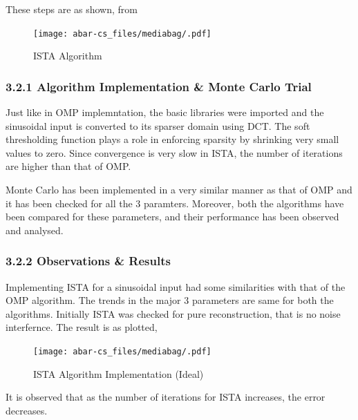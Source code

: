 \documentclass[
  letterpaper,
  DIV=11,
  numbers=noendperiod]{scrartcl}
\begin{document}
These steps are as shown, from

\begin{figure}[H]

{\centering \texttt{[image: abar-cs\_files/mediabag/.pdf]}

}

\caption{ISTA Algorithm\autocite{fast-sparse-coding}}

\end{figure}%

\subsubsection{3.2.1 Algorithm Implementation \& Monte Carlo
Trial}\label{algorithm-implementation-monte-carlo-trial}

Just like in OMP implemntation, the basic libraries were imported and
the sinusoidal input is converted to its sparser domain using DCT. The
soft thresholding function plays a role in enforcing sparsity by
shrinking very small values to zero. Since convergence is very slow in
ISTA, the number of iterations are higher than that of OMP.

Monte Carlo has been implemented in a very similar manner as that of OMP
and it has been checked for all the 3 paramters. Moreover, both the
algorithms have been compared for these parameters, and their
performance has been observed and analysed.

\subsubsection{3.2.2 Observations \&
Results}\label{observations-results-1}

Implementing ISTA for a sinusoidal input had some similarities with that
of the OMP algorithm. The trends in the major 3 parameters are same for
both the algorithms. Initially ISTA was checked for pure reconstruction,
that is no noise interfernce. The result is as plotted,

\begin{figure}[H]

{\centering \texttt{[image: abar-cs\_files/mediabag/.pdf]}

}

\caption{ISTA Algorithm Implementation (Ideal)}

\end{figure}%

It is observed that as the number of iterations for ISTA increases, the
error decreases.
\end{document}
